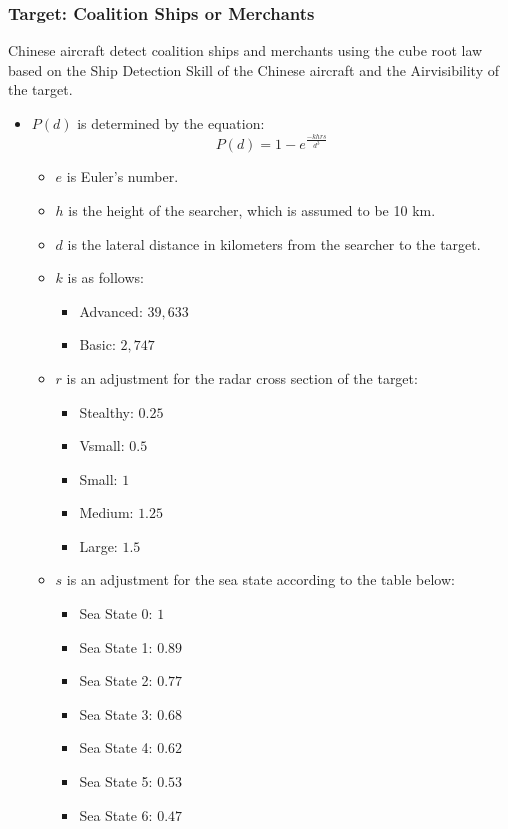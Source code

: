 \documentclass{article}
\begin{document}
    \subsubsection{Target: Coalition Ships or Merchants}
    Chinese aircraft detect coalition ships and merchants using the cube root law based on the Ship Detection Skill of the Chinese aircraft and the Airvisibility of the target.
        \begin{itemize}
            \item \( P(d) \) is determined by the equation:
            \[
            P(d) = 1 - e^{\frac{-khrs}{d^3}}
            \]
            \begin{itemize}
                \item \( e \) is Euler’s number.
                \item \( h \) is the height of the searcher, which is assumed to be 10 km.
                \item \( d \) is the lateral distance in kilometers from the searcher to the target.
                \item \( k \) is as follows:
                    \begin{itemize}
                        \item Advanced: \( 39{,}633 \)
                        \item Basic: \( 2{,}747 \)
                    \end{itemize}
                \item \( r \) is an adjustment for the radar cross section of the target:
                \begin{itemize}
                    \item Stealthy: \( 0.25 \)
                    \item Vsmall: \( 0.5 \)
                    \item Small: \( 1 \)
                    \item Medium: \( 1.25 \)
                    \item Large: \( 1.5 \)
                \end{itemize}
                \item \( s \) is an adjustment for the sea state according to the table below:
                \begin{itemize}
                    \item Sea State 0: \( 1 \)
                    \item Sea State 1: \( 0.89 \)
                    \item Sea State 2: \( 0.77 \)
                    \item Sea State 3: \( 0.68 \)
                    \item Sea State 4: \( 0.62 \)
                    \item Sea State 5: \( 0.53 \)
                    \item Sea State 6: \( 0.47 \)
                \end{itemize}
            \end{itemize}
        \end{itemize}
        
\end{document}
